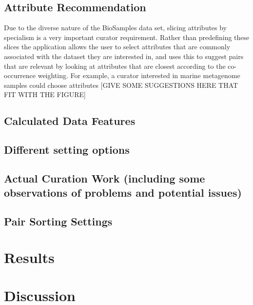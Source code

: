 \documentclass{bmcart}
\begin{document}
\subsection*{Attribute Recommendation}

Due to the diverse nature of the BioSamples data set, slicing attributes by specialism is a very important curator requirement. Rather than predefining these slices the application allows the user to select attributes that are commonly associated with the dataset they are interested in, and uses this to suggest pairs that are relevant by looking at attributes that are closest according to the co-occurrence weighting. For example, a curator interested in marine metagenome samples could choose attributes [GIVE SOME SUGGESTIONS HERE THAT FIT WITH THE FIGURE]



\subsection*{Calculated Data Features}

\subsection*{Different setting options}

\subsection*{Actual Curation Work (including some observations of problems and potential issues)}
\subsection*{Pair Sorting Settings} \label{pair_sorting_settings}

\section*{Results}


\section*{Discussion}
\end{document}
